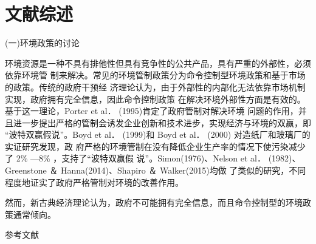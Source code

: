 \documentclass{ERJ}
\begin{document}
\section{文献综述}
(一)环境政策的讨论

环境资源是一种不具有排他性但具有竞争性的公共产品，具有严重的外部性，必须依靠环境管
制来解决。常见的环境管制政策分为命令控制型环境政策和基于市场的政策。传统的政府干预经
济理论认为，由于外部性的内部化无法依靠市场机制实现，政府拥有完全信息，因此命令控制政策
在解决环境外部性方面是有效的。基于这一理论，Porter et al． (1995)肯定了政府管制对解决环境
问题的作用，并且进一步提出严格的管制会诱发企业创新和技术进步，实现经济与环境的双赢，即
“波特双赢假说”。Boyd et al． (1999)和 Boyd et al． (2000) 对造纸厂和玻璃厂的实证研究发现，政
府严格的环境管制在没有降低企业生产率的情况下使污染减少了 2\% —8\% ，支持了“波特双赢假
说”。Simon(1976)、Nelson et al． (1982)、Greenstone ＆ Hanna(2014)、Shapiro ＆ Walker(2015)均做
了类似的研究，不同程度地证实了政府严格管制对环境的改善作用。

然而，新古典经济理论认为，政府不可能拥有完全信息，而且命令控制型的环境政策通常倾向。

\vspace*{0.8\baselineskip}
\begin{flushleft}
\small 参考文献
\vspace*{-0.3\baselineskip}
\end{flushleft}
\printbibliography[heading=none]
\end{document}
